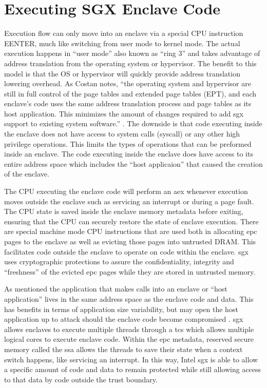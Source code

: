 \section{Executing SGX Enclave Code}
Execution flow can only move into an enclave via a special CPU instruction EENTER, much like switching from user mode to kernel mode. The actual execution happens in ``user mode'' also known as ``ring 3'' and takes advantage of address translation from the operating system or hypervisor. The benefit to this model is that the OS or hypervisor will quickly provide address translation lowering overhead. As Costan notes, ``the operating system and hypervisor are still in full control of the page tables and extended page tables (EPT), and each enclave's code uses the same address translation process and page tables as its host application. This minimizes the amount of changes required to add \gls{sgx} support to existing system software.'' \cite{Costan2016}. The downside is that code executing inside the enclave does not have access to system calls (syscall) or any other high privilege operations. This limits the types of operations that can be preformed inside an enclave. The code executing inside the enclave does have access to its entire address space which includes the ``host applicaion'' that caused the creation of the enclave.

The CPU executing the enclave code will perform an \gls{aex} whenever execution moves outside the enclave such as servicing an interrupt or during a page fault. The CPU state is saved inside the enclave memory metadata before exiting, ensuring that the CPU can securely restore the state of enclave execution. There are special machine mode CPU instructions that are used both in allocating \gls{epc} pages to the enclave as well as evicting those pages into untrusted DRAM. This facilitates code outside the enclave to operate on code within the enclave. \gls{sgx} uses cryptographic protections to assure the confidentiality, integrity and ``freshness'' \cite{Costan2016} of the evicted \gls{epc} pages while they are stored in untrusted memory. 

As mentioned the application that makes calls into an enclave or ``host application'' lives in the same address space as the enclave code and data. This has benefits in terms of application size variability, but may open the host application up to attack should the enclave code become compromised \cite{schwarz2019practical}.  \gls{sgx} allows enclaves to execute multiple threads through a \gls{tcs} which allows multiple logical cores to execute enclave code. Within the \gls{epc} metadata, reserved secure memory called the \gls{ssa} allows the threads to save their state when a context switch happens, like servicing an interrupt. In this way, Intel \gls{sgx} is able to allow a specific amount of code and data to remain protected while still allowing access to that data by code outside the trust boundary.

